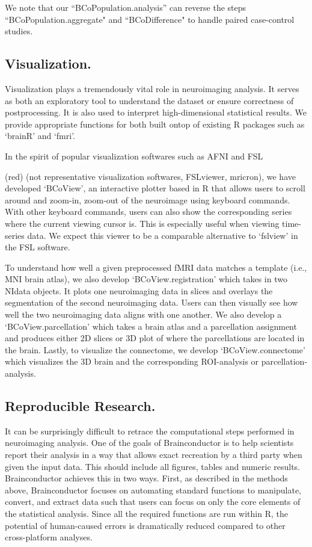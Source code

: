 \documentclass{nature}
\begin{document}
We note that our ``BCoPopulation.analysis'' can reverse the steps
``BCoPopulation.aggregate" and ``BCoDifference" to handle paired case-control studies.


\subsection{Visualization.}
Visualization plays a tremendously vital role in neuroimaging analysis.
It serves as both an exploratory tool to understand the dataset or ensure
correctness of postprocessing. It is also used to interpret high-dimensional statistical
results.
We provide appropriate functions for both built ontop of existing R packages
such
as `brainR' and `fmri'.

In the spirit of popular visualization softwares such as AFNI and FSL
{\color(red) (not representative visualization softwares, FSLviewer, mricron), 
we have developed `BCoView', an interactive plotter based in R that allows users to
scroll around and
zoom-in, zoom-out of the neuroimage using keyboard commands. With other keyboard
commands, users can also show the corresponding series where the current
viewing
cursor is. This is especially useful when viewing time-series data. 
We expect this viewer to be a comparable alternative to `fslview' in
the FSL
software.

To understand how well a given preprocessed fMRI data matches a template (i.e.,
MNI brain
atlas), we also develop `BCoView.registration' which takes in two NIdata
objects.
It plots one neuroimaging data in slices and overlays the segmentation of the
second
neuroimaging data. Users can then visually see how well the two neuroimaging
data aligns
with one another. We also develop a `BCoView.parcellation' which takes a brain
atlas and
a parcellation assignment and produces either 2D slices or 3D plot of where the
parcellations
are located in the brain.
Lastly, to visualize the connectome, we develop `BCoView.connectome' which
visualizes the
3D brain and the corresponding ROI-analysis or parcellation-analysis.


\subsection{Reproducible Research.}

It can be surprisingly difficult to retrace the computational steps performed
in neuroimaging analysis. One of the goals of Brainconductor is to help
scientists report their analysis in a way that allows exact recreation by
a third party when given the input data. This should include all figures,
tables and numeric results. Brainconductor achieves this in two ways.
First, as described in the methods above, Brainconductor focuses on automating
standard functions to manipulate, convert, and extract data such that users
can focus on only the core elements of the statistical analysis. Since all the
required functions are run within R, the potential of human-caused errors is
dramatically reduced compared to other cross-platform analyses.

}
\end{document}
